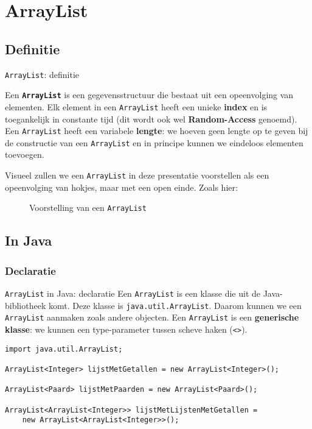 \documentclass[handout]{beamer}
\newcommand{\term}[1]{\textbf{#1}}
\newcommand{\dsarraylist}{\texttt{ArrayList}}
\begin{document}
\section{ArrayList}
\subsection{Definitie}
\begin{frame}{\dsarraylist{}: definitie}
\begin{definition}[\dsarraylist{}]
Een \term{\dsarraylist{}} is een gegevensstructuur die bestaat uit een opeenvolging van elementen. Elk element in een \dsarraylist{} heeft een unieke \term{index} en is toegankelijk in constante tijd (dit wordt ook wel \term{Random-Access} genoemd). Een \dsarraylist{} heeft een variabele \term{lengte}: we hoeven geen lengte op te geven bij de constructie van een \dsarraylist{} en in principe kunnen we eindeloos elementen toevoegen.
\end{definition}
Visueel zullen we een \dsarraylist{} in deze presentatie voorstellen als een opeenvolging van hokjes, maar met een open einde. Zoals hier:
\begin{figure}
\caption{Voorstelling van een \dsarraylist{}}
\end{figure}
\end{frame}
\subsection{In Java}
\subsubsection{Declaratie}
\begin{frame}[fragile]{\dsarraylist{} in Java: declaratie}
Een \dsarraylist{} is een klasse die uit de Java-bibliotheek komt. Deze klasse is \texttt{java.util.ArrayList}. Daarom kunnen we een \dsarraylist{} aanmaken zoals andere objecten. Een \dsarraylist{} is een \term{generische klasse}: we kunnen een type-parameter tussen scheve haken (\texttt{<>}).
\begin{example}[Declaratie \dsarraylist{}]
\begin{lstlisting}
import java.util.ArrayList;

ArrayList<Integer> lijstMetGetallen = new ArrayList<Integer>();

ArrayList<Paard> lijstMetPaarden = new ArrayList<Paard>();

ArrayList<ArrayList<Integer>> lijstMetLijstenMetGetallen =
    new ArrayList<ArrayList<Integer>>();
\end{lstlisting}
\end{example}
\end{frame}
\end{document}
